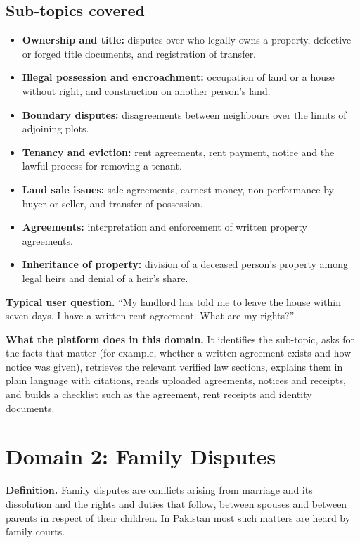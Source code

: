 \documentclass[11pt,a4paper]{article}
\begin{document}
\subsection*{Sub-topics covered}
\begin{itemize}
  \item \textbf{Ownership and title:} disputes over who legally owns a property, defective or forged title documents, and registration of transfer.
  \item \textbf{Illegal possession and encroachment:} occupation of land or a house without right, and construction on another person's land.
  \item \textbf{Boundary disputes:} disagreements between neighbours over the limits of adjoining plots.
  \item \textbf{Tenancy and eviction:} rent agreements, rent payment, notice and the lawful process for removing a tenant.
  \item \textbf{Land sale issues:} sale agreements, earnest money, non-performance by buyer or seller, and transfer of possession.
  \item \textbf{Agreements:} interpretation and enforcement of written property agreements.
  \item \textbf{Inheritance of property:} division of a deceased person's property among legal heirs and denial of a heir's share.
\end{itemize}
\textbf{Typical user question.} ``My landlord has told me to leave the house within seven days. I have a written rent agreement. What are my rights?''

\textbf{What the platform does in this domain.} It identifies the sub-topic, asks for the facts that matter (for example, whether a written agreement exists and how notice was given), retrieves the relevant verified law sections, explains them in plain language with citations, reads uploaded agreements, notices and receipts, and builds a checklist such as the agreement, rent receipts and identity documents.

\section{Domain 2: Family Disputes}
\textbf{Definition.} Family disputes are conflicts arising from marriage and its dissolution and the rights and duties that follow, between spouses and between parents in respect of their children. In Pakistan most such matters are heard by family courts.
\end{document}
